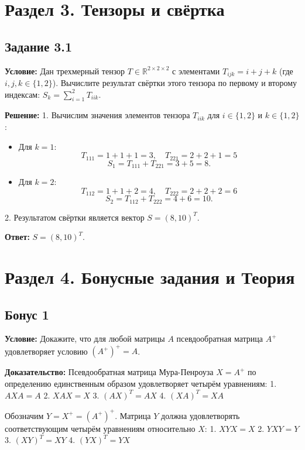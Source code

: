 \documentclass[11pt, a4paper]{article}
\begin{document}
\section{Раздел 3. Тензоры и свёртка}

\subsection*{Задание 3.1}
\textbf{Условие:} Дан трехмерный тензор $T \in \mathbb{R}^{2 \times 2 \times 2}$ с элементами $T_{ijk} = i + j + k$ (где $i,j,k \in \{1, 2\}$). Вычислите результат свёртки этого тензора по первому и второму индексам: $S_k = \sum_{i=1}^2 T_{iik}$.

\textbf{Решение:}
1. Вычислим значения элементов тензора $T_{iik}$ для $i \in \{1, 2\}$ и $k \in \{1, 2\}$:
\begin{itemize}
\item Для $k = 1$:
$$ T_{111} = 1 + 1 + 1 = 3, \quad T_{221} = 2 + 2 + 1 = 5 $$
$$ S_1 = T_{111} + T_{221} = 3 + 5 = 8. $$

\item Для $k = 2$:
$$ T_{112} = 1 + 1 + 2 = 4, \quad T_{222} = 2 + 2 + 2 = 6 $$
$$ S_2 = T_{112} + T_{222} = 4 + 6 = 10. $$
\end{itemize}

2. Результатом свёртки является вектор $S = (8, 10)^T$.

\textbf{Ответ:} $S = (8, 10)^T$.

\newpage

\section{Раздел 4. Бонусные задания и Теория}

\subsection*{Бонус 1}
\textbf{Условие:} Докажите, что для любой матрицы $A$ псевдообратная матрица $A^+$ удовлетворяет условию $(A^+)^+ = A$.

\textbf{Доказательство:}
Псевдообратная матрица Мура-Пенроуза $X = A^+$ по определению единственным образом удовлетворяет четырём уравнениям:
1. $A X A = A$
2. $X A X = X$
3. $(A X)^T = A X$
4. $(X A)^T = X A$

Обозначим $Y = X^+ = (A^+)^+$. Матрица $Y$ должна удовлетворять соответствующим четырём уравнениям относительно $X$:
1. $X Y X = X$
2. $Y X Y = Y$
3. $(X Y)^T = X Y$
4. $(Y X)^T = Y X$
\end{document}
